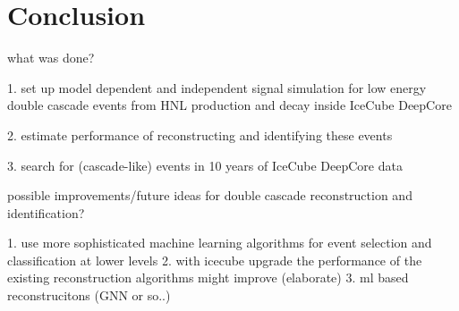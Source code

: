 \setchapterpreamble[u]{\margintoc}

\chapter{Conclusion}




what was done?

1. set up model dependent and independent signal simulation for low energy double cascade events from HNL production and decay inside IceCube DeepCore

2. estimate performance of reconstructing and identifying these events

3. search for (cascade-like) events in 10 years of IceCube DeepCore data



possible improvements/future ideas for double cascade reconstruction and identification?

1. use more sophisticated machine learning algorithms for event selection and classification at lower levels
2. with icecube upgrade the performance of the existing reconstruction algorithms might improve (elaborate)
3. ml based reconstrucitons (GNN or so..)







